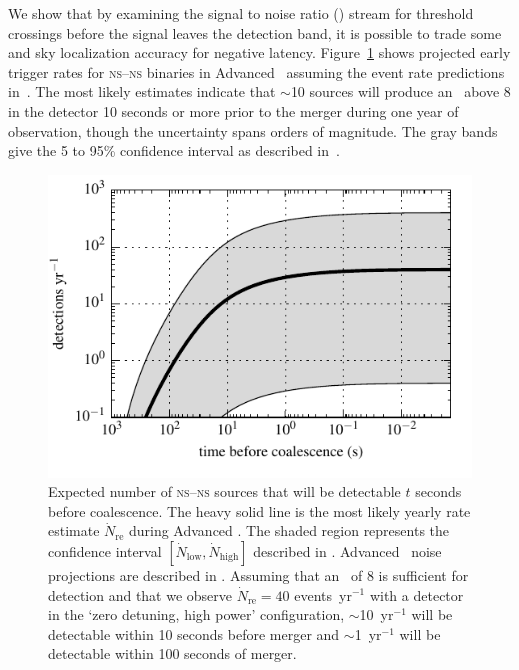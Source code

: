 We show that by examining the signal to noise ratio (\SNR{}) stream for
threshold crossings before the \GW{} signal leaves the detection band, it is
possible to trade some \SNR{} and sky localization
accuracy for negative latency.  Figure~\ref{fig:earlywarning} shows
projected early trigger rates for \textsc{ns}--\textsc{ns} binaries in Advanced
\LIGO\ assuming the event rate predictions in~\cite{Abadie:2010p10836}.  The
most likely estimates indicate that $\sim$10 sources will produce an \SNR\
above 8 in the detector 10 seconds or more prior to the merger during one
year of observation, though the uncertainty spans orders of magnitude.
The gray bands give the 5 to 95\% confidence interval as described
in~\cite{Abadie:2010p10836}.
%
\begin{figure}
\begin{center}
\includegraphics{figures/snr_in_time.pdf}
\caption{\label{fig:earlywarning} Expected number of \textsc{ns}--\textsc{ns}
sources that will be detectable $t$ seconds before coalescence.  The heavy
solid line is the most likely yearly rate estimate $\dot N_{\mathrm{re}}$
during Advanced \LIGO.  The shaded region represents the confidence interval
$[\dot N_{\mathrm{low}}, \dot N_{\mathrm{high}}]$ described in
\cite{Abadie:2010p10836}.  Advanced \LIGO\ noise projections are described in
\cite{ALIGONoise}.  Assuming that an \SNR\ of 8 is sufficient for detection and
that we observe $\dot N_{\mathrm{re}} = 40$ events~yr$^{-1}$ with a detector in
the `zero detuning, high power' configuration, $\sim$10~yr$^{-1}$ will be
detectable within 10 seconds before merger and $\sim$1~yr$^{-1}$ will be
detectable within 100 seconds of merger.} 
\end{center}
\end{figure}

